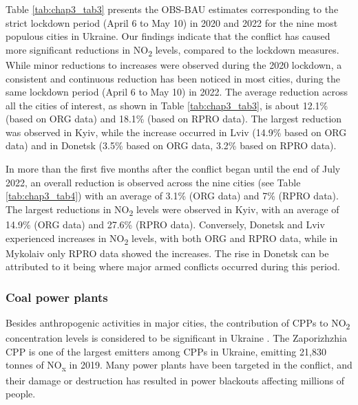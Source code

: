 Table \ref{tab:chap3_tab3} presents the OBS-BAU estimates corresponding to the strict lockdown period (April 6 to May 10) in 2020 and 2022 for the nine most populous cities in Ukraine. Our findings indicate that the conflict has caused more significant reductions in NO\textsubscript{2} levels, compared to the lockdown measures. While minor reductions to increases were observed during the 2020 lockdown, a consistent and continuous reduction has been noticed in most cities, during the same lockdown period (April 6 to May 10) in 2022. The average reduction across all the cities of interest, as shown in Table \ref{tab:chap3_tab3}, is about 12.1\% (based on ORG data) and 18.1\% (based on RPRO data). The largest reduction was observed in Kyiv, while the increase occurred in Lviv (14.9\% based on ORG data) and in Donetsk (3.5\% based on ORG data, 3.2\% based on RPRO data).\par

In more than the first five months after the conflict began until the end of July 2022, an overall reduction is observed across the nine cities (see Table \ref{tab:chap3_tab4}) with an average of 3.1\% (ORG data) and 7\% (RPRO data). The largest reductions in NO\textsubscript{2} levels were observed in Kyiv, with an average of 14.9\% (ORG data) and 27.6\% (RPRO data). Conversely, Donetsk and Lviv experienced increases in NO\textsubscript{2} levels, with both ORG and RPRO data, while in Mykolaiv only RPRO data showed the increases. The rise in Donetsk can be attributed to it being where major armed conflicts occurred during this period.\par
\subsubsection*{Coal power plants}
Besides anthropogenic activities in major cities, the contribution of CPPs to NO\textsubscript{2} concentration levels is considered to be significant in Ukraine \citep{lauri2021}. The Zaporizhzhia CPP is one of the largest emitters among CPPs in Ukraine, emitting 21,830 tonnes of NO\textsubscript{x} in 2019. Many power plants have been targeted in the conflict, and their damage or destruction has resulted in power blackouts affecting millions of people. \par

